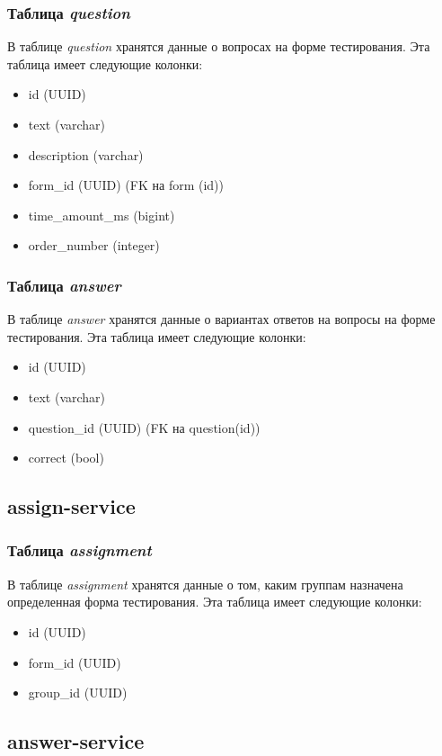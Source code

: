 \documentclass[4paper,12pt]{article}
\begin{document}
	\subsubsection{Таблица \textit{question}}
	В таблице \textit{question} хранятся данные о вопросах на форме тестирования. Эта таблица имеет следующие колонки:
	\begin{itemize}
		\item id (UUID)
		\item text (varchar)
		\item description (varchar)
		\item form\_id (UUID) (FK на form (id))
		\item time\_amount\_ms (bigint)
		\item order\_number (integer)
	\end{itemize}
	
	\subsubsection{Таблица \textit{answer}}
	В таблице \textit{answer} хранятся данные о вариантах ответов на вопросы на форме тестирования. Эта таблица имеет следующие колонки:
	\begin{itemize}
		\item id (UUID)
		\item text (varchar)
		\item question\_id (UUID) (FK на question(id))
		\item correct (bool)
	\end{itemize}
	
	\subsection{assign-service}
	\subsubsection{Таблица \textit{assignment}}
	В таблице \textit{assignment} хранятся данные о том, каким группам назначена определенная форма тестирования. Эта таблица имеет следующие колонки:
	\begin{itemize}
		\item id (UUID)
		\item form\_id (UUID)
		\item group\_id (UUID)
	\end{itemize}
	
	\subsection{answer-service}
\end{document}
